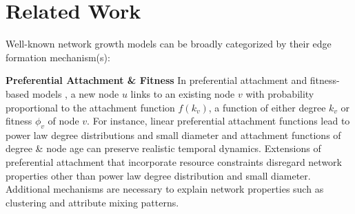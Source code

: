 \vspace{-4pt}
\section{Related Work}
\label{sec:Related Work}
Well-known network growth models can be broadly categorized by their
edge formation mechanism(s):

\textbf{Preferential Attachment \& Fitness}
In preferential attachment and fitness-based models \cite{bell2017network,medo2011temporal,bianconi2001bose,caldarelli2002scale}, a new node $u$ links to an existing node $v$
with probability proportional to the attachment function $f(k_v)$, a function of
either degree $k_v$ or fitness $\phi_v$ of node $v$.
For instance, linear preferential attachment functions
\cite{barabasi1999emergence,kumar2000stochastic,dorogovtsev2000structure} lead to
power law degree distributions and small diameter \cite{bollobas2004diameter}
and attachment functions of degree \& node age \cite{wang2013quantifying}
can preserve realistic temporal dynamics.
Extensions of preferential
attachment \cite{mossa2002truncation,zeng2005construction,wang2009local} that
incorporate resource constraints
disregard network properties other than power law degree distribution and small diameter.
Additional mechanisms are necessary to explain network properties
such as clustering and attribute mixing patterns.


